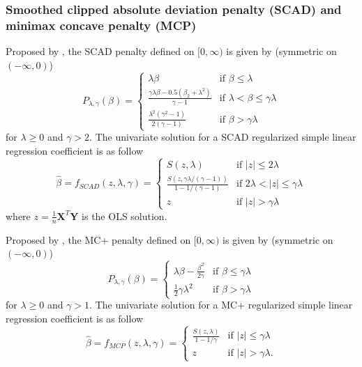 \subsubsection{Smoothed clipped absolute deviation penalty (SCAD) and minimax concave penalty (MCP)}
Proposed by \cite{fan2001variable}, the SCAD penalty defined on $[0, \infty)$ is given by (symmetric on $(-\infty, 0)$)
\begin{equation}
    P_{\lambda,\gamma}(\beta) = 
        \begin{cases}
            \lambda\beta & \text{if $\beta \leq \lambda$}\\
            \frac{\gamma\lambda\beta-0.5(\beta_2+\lambda^2)}{\gamma-1} & \text{if $\lambda<\beta\leq\gamma\lambda$}\\
            \frac{\lambda^2(\gamma^2-1)}{2(\gamma-1)} & \text{if $\beta>\gamma\lambda$}
        \end{cases} \label{eq1.16}      
\end{equation}
for $\lambda\geq0$ and $\gamma>2$. The univariate solution for a SCAD regularized simple linear regression coefficient is as follow
\begin{equation}
    \hat{\beta}=f_{SCAD}(z,\lambda,\gamma)= 
        \begin{cases}
            S(z,\lambda) & \text{if $|z|\leq 2\lambda$}\\
            \frac{S(z, \gamma\lambda/(\gamma-1))}{1-1/(\gamma-1)} & \text{if $2\lambda<|z|\leq\gamma\lambda$}\\
            z & \text{if $|z|>\gamma\lambda$}
        \end{cases} \label{eq1.17}      
\end{equation}
where $z=\frac{1}{n}\bm{X}^T\bm{Y}$ is the OLS solution.

Proposed by \cite{zhang2010nearly}, the MC+ penalty defined on $[0, \infty)$ is given by (symmetric on $(-\infty, 0)$)
\begin{equation}
    P_{\lambda,\gamma}(\beta) = 
        \begin{cases}
            \lambda\beta - \frac{\beta^2}{2\gamma} & \text{if $\beta \leq \gamma\lambda$}\\
            \frac{1}{2}\gamma\lambda^2 & \text{if $\beta>\gamma\lambda$}
        \end{cases} \label{eq1.18}      
\end{equation}
for $\lambda\geq0$ and $\gamma>1$. The univariate solution for a MC+ regularized simple linear regression coefficient is as follow
\begin{equation}
    \hat{\beta}=f_{MCP}(z,\lambda,\gamma)= 
        \begin{cases}
            \frac{S(z,\lambda)}{1-1/\gamma} & \text{if $|z|\leq \gamma\lambda$}\\
            z & \text{if $|z|>\gamma\lambda$}.
        \end{cases} \label{eq1.19}      
\end{equation}

